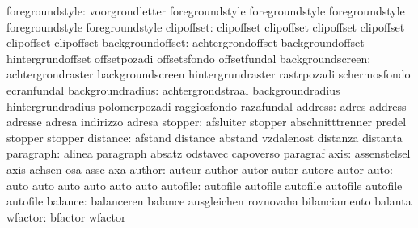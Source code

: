           foregroundstyle: voorgrondletter           foregroundstyle
                           foregroundstyle           foregroundstyle
                           foregroundstyle           foregroundstyle
clipoffset: clipoffset   clipoffset
            clipoffset   clipoffset
            clipoffset   clipoffset
         backgroundoffset: achtergrondoffset         backgroundoffset
                           hintergrundoffset         offsetpozadi
                           offsetsfondo              offsetfundal
         backgroundscreen: achtergrondraster         backgroundscreen
                           hintergrundraster         rastrpozadi
                           schermosfondo             ecranfundal
         backgroundradius: achtergrondstraal         backgroundradius
                           hintergrundradius         polomerpozadi
                           raggiosfondo              razafundal
                  address: adres                     address
                           adresse                   adresa
                           indirizzo                 adresa
                  stopper: afsluiter                 stopper
                           abschnitttrenner          predel
                           stopper                   stopper
                 distance: afstand                   distance
                           abstand                   vzdalenost
                           distanza                  distanta
                paragraph: alinea                    paragraph
                           absatz                    odstavec
                           capoverso                 paragraf
                     axis: assenstelsel              axis
                           achsen                    osa
                           asse                      axa
                   author: auteur                    author
                           autor                     autor
                           autore                    autor
                     auto: auto                      auto
                           auto                      auto
                           auto                      auto
                 autofile: autofile                  autofile
                           autofile                  autofile
                           autofile                  autofile %
                  balance: balanceren                balance
                           ausgleichen               rovnovaha
                           bilanciamento             balanta
                  wfactor: bfactor                   wfactor
